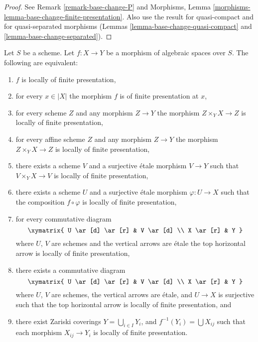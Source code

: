 \begin{proof}
See Remark \ref{remark-base-change-P} and
Morphisms, Lemma \ref{morphisms-lemma-base-change-finite-presentation}.
Also use the result for quasi-compact and for quasi-separated morphisms
(Lemmas \ref{lemma-base-change-quasi-compact} and
\ref{lemma-base-change-separated}).
\end{proof}

\begin{lemma}
\label{lemma-finite-presentation-local}
Let $S$ be a scheme.
Let $f : X \to Y$ be a morphism of algebraic spaces over $S$.
The following are equivalent:
\begin{enumerate}
\item $f$ is locally of finite presentation,
\item for every $x \in |X|$ the morphism $f$ is of finite presentation at $x$,
\item for every scheme $Z$ and any morphism $Z \to Y$ the morphism
$Z \times_Y X \to Z$ is locally of finite presentation,
\item for every affine scheme $Z$ and any morphism
$Z \to Y$ the morphism $Z \times_Y X \to Z$ is locally of finite presentation,
\item there exists a scheme $V$ and a surjective \'etale morphism
$V \to Y$ such that $V \times_Y X \to V$ is
locally of finite presentation,
\item there exists a scheme $U$ and a surjective \'etale morphism
$\varphi : U \to X$ such that the composition $f \circ \varphi$
is locally of finite presentation,
\item for every commutative diagram
$$
\xymatrix{
U \ar[d] \ar[r] & V \ar[d] \\
X \ar[r] & Y
}
$$
where $U$, $V$ are schemes and the vertical arrows are \'etale
the top horizontal arrow is locally of finite presentation,
\item there exists a commutative diagram
$$
\xymatrix{
U \ar[d] \ar[r] & V \ar[d] \\
X \ar[r] & Y
}
$$
where $U$, $V$ are schemes, the vertical arrows are \'etale, and
$U \to X$ is surjective such that the top horizontal arrow is
locally of finite presentation, and
\item there exist Zariski coverings $Y = \bigcup_{i \in I} Y_i$,
and $f^{-1}(Y_i) = \bigcup X_{ij}$ such that
each morphism $X_{ij} \to Y_i$ is locally of finite presentation.
\end{enumerate}
\end{lemma}

